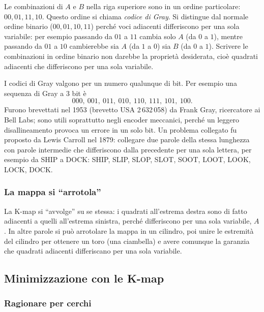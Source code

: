 \documentclass[11pt,a4paper]{article}
\begin{document}
Le combinazioni di $A$ e $B$ nella riga superiore sono in un ordine particolare: $00, 01, 11, 10$. Questo ordine si chiama \emph{codice di Gray}. Si distingue dal normale ordine binario ($00, 01, 10, 11$) perché voci adiacenti differiscono per una sola variabile: per esempio passando da $01$ a $11$ cambia solo $A$ (da $0$ a $1$), mentre passando da $01$ a $10$ cambierebbe sia $A$ (da $1$ a $0$) sia $B$ (da $0$ a $1$). Scrivere le combinazioni in ordine binario non darebbe la proprietà desiderata, cioè quadrati adiacenti che differiscono per una sola variabile.

\begin{osservazione}
I codici di Gray valgono per un numero qualunque di bit. Per esempio una sequenza di Gray a $3$ bit è
\[
000,\ 001,\ 011,\ 010,\ 110,\ 111,\ 101,\ 100.
\]
Furono brevettati nel 1953 (brevetto USA 2\,632\,058) da Frank Gray, ricercatore ai Bell Labs; sono utili soprattutto negli encoder meccanici, perché un leggero disallineamento provoca un errore in un solo bit. Un problema collegato fu proposto da Lewis Carroll nel 1879: collegare due parole della stessa lunghezza con parole intermedie che differiscono dalla precedente per una sola lettera, per esempio da SHIP a DOCK: SHIP, SLIP, SLOP, SLOT, SOOT, LOOT, LOOK, LOCK, DOCK.
\end{osservazione}

\subsubsection{La mappa si ``arrotola''}

La K-map si ``avvolge'' su se stessa: i quadrati all'estrema destra sono di fatto adiacenti a quelli all'estrema sinistra, perché differiscono per una sola variabile, $A$. In altre parole si può arrotolare la mappa in un cilindro, poi unire le estremità del cilindro per ottenere un toro (una ciambella) e avere comunque la garanzia che quadrati adiacenti differiscano per una sola variabile.

\subsection{Minimizzazione con le K-map}

\subsubsection{Ragionare per cerchi}
\end{document}
